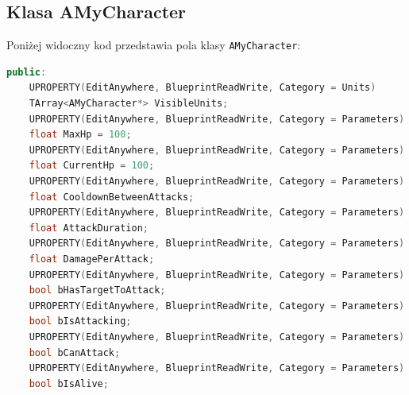 \documentclass[12pt]{report}
\begin{document}
\subsection{Klasa AMyCharacter}
Poniżej widoczny kod przedstawia pola klasy \texttt{AMyCharacter}:

\begin{lstlisting}[language=C++, backgroundcolor=\color{black!5}, basicstyle=\footnotesize, caption=Publiczne pola klasy \texttt{AMyCharacter}]
public:	
	UPROPERTY(EditAnywhere, BlueprintReadWrite, Category = Units)
	TArray<AMyCharacter*> VisibleUnits;
	UPROPERTY(EditAnywhere, BlueprintReadWrite, Category = Parameters)
	float MaxHp = 100;
	UPROPERTY(EditAnywhere, BlueprintReadWrite, Category = Parameters)
	float CurrentHp = 100;
	UPROPERTY(EditAnywhere, BlueprintReadWrite, Category = Parameters)
	float CooldownBetweenAttacks;
	UPROPERTY(EditAnywhere, BlueprintReadWrite, Category = Parameters)
	float AttackDuration;
	UPROPERTY(EditAnywhere, BlueprintReadWrite, Category = Parameters)
	float DamagePerAttack;
	UPROPERTY(EditAnywhere, BlueprintReadWrite, Category = Parameters)
	bool bHasTargetToAttack;
	UPROPERTY(EditAnywhere, BlueprintReadWrite, Category = Parameters)
	bool bIsAttacking;
	UPROPERTY(EditAnywhere, BlueprintReadWrite, Category = Parameters)
	bool bCanAttack;
	UPROPERTY(EditAnywhere, BlueprintReadWrite, Category = Parameters)
	bool bIsAlive;
\end{lstlisting}
\end{document}
